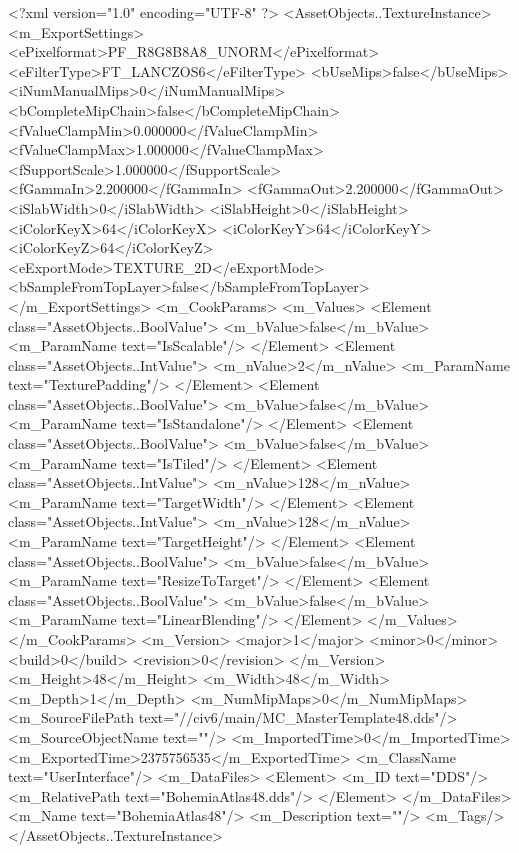 <?xml version="1.0" encoding="UTF-8" ?>
<AssetObjects..TextureInstance>
	<m_ExportSettings>
		<ePixelformat>PF_R8G8B8A8_UNORM</ePixelformat>
		<eFilterType>FT_LANCZOS6</eFilterType>
		<bUseMips>false</bUseMips>
		<iNumManualMips>0</iNumManualMips>
		<bCompleteMipChain>false</bCompleteMipChain>
		<fValueClampMin>0.000000</fValueClampMin>
		<fValueClampMax>1.000000</fValueClampMax>
		<fSupportScale>1.000000</fSupportScale>
		<fGammaIn>2.200000</fGammaIn>
		<fGammaOut>2.200000</fGammaOut>
		<iSlabWidth>0</iSlabWidth>
		<iSlabHeight>0</iSlabHeight>
		<iColorKeyX>64</iColorKeyX>
		<iColorKeyY>64</iColorKeyY>
		<iColorKeyZ>64</iColorKeyZ>
		<eExportMode>TEXTURE_2D</eExportMode>
		<bSampleFromTopLayer>false</bSampleFromTopLayer>
	</m_ExportSettings>
	<m_CookParams>
		<m_Values>
			<Element class="AssetObjects..BoolValue">
				<m_bValue>false</m_bValue>
				<m_ParamName text="IsScalable"/>
			</Element>
			<Element class="AssetObjects..IntValue">
				<m_nValue>2</m_nValue>
				<m_ParamName text="TexturePadding"/>
			</Element>
			<Element class="AssetObjects..BoolValue">
				<m_bValue>false</m_bValue>
				<m_ParamName text="IsStandalone"/>
			</Element>
			<Element class="AssetObjects..BoolValue">
				<m_bValue>false</m_bValue>
				<m_ParamName text="IsTiled"/>
			</Element>
			<Element class="AssetObjects..IntValue">
				<m_nValue>128</m_nValue>
				<m_ParamName text="TargetWidth"/>
			</Element>
			<Element class="AssetObjects..IntValue">
				<m_nValue>128</m_nValue>
				<m_ParamName text="TargetHeight"/>
			</Element>
			<Element class="AssetObjects..BoolValue">
				<m_bValue>false</m_bValue>
				<m_ParamName text="ResizeToTarget"/>
			</Element>
			<Element class="AssetObjects..BoolValue">
				<m_bValue>false</m_bValue>
				<m_ParamName text="LinearBlending"/>
			</Element>
		</m_Values>
	</m_CookParams>
	<m_Version>
		<major>1</major>
		<minor>0</minor>
		<build>0</build>
		<revision>0</revision>
	</m_Version>
	<m_Height>48</m_Height>
	<m_Width>48</m_Width>
	<m_Depth>1</m_Depth>
	<m_NumMipMaps>0</m_NumMipMaps>
	<m_SourceFilePath text="//civ6/main/MC_MasterTemplate\Textures\BohemiaAtlas48.dds"/>
	<m_SourceObjectName text=""/>
	<m_ImportedTime>0</m_ImportedTime>
	<m_ExportedTime>2375756535</m_ExportedTime>
	<m_ClassName text="UserInterface"/>
	<m_DataFiles>
		<Element>
			<m_ID text="DDS"/>
			<m_RelativePath text="BohemiaAtlas48.dds"/>
		</Element>
	</m_DataFiles>
	<m_Name text="BohemiaAtlas48"/>
	<m_Description text=""/>
	<m_Tags/>
</AssetObjects..TextureInstance>

